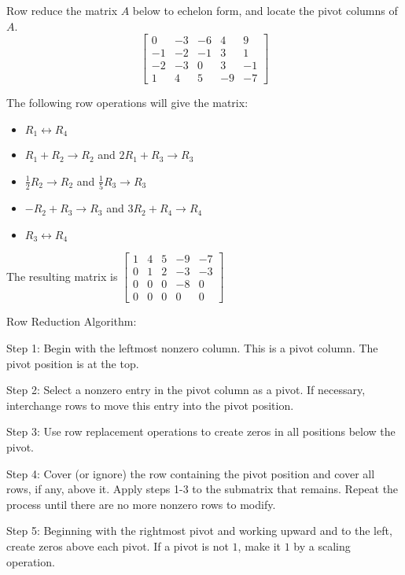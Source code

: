 \documentclass[../linalg.tex]{subfiles}
\begin{document}
\begin{example}
    Row reduce the matrix $A$ below to echelon form, and locate the pivot columns of $A$.
    \[ \begin{bmatrix}
        0 & -3 & -6 & 4 & 9\\
        -1 & -2 & -1 & 3 & 1\\
        -2 & -3 & 0 & 3 &-1\\
        1&4&5&-9&-7
    \end{bmatrix} \]

    The following row operations will give the matrix:
    \begin{itemize}
        \item $R_1 \leftrightarrow R_4$
        \item $R_1 + R_2 \rightarrow R_2$ and $2R_1+R_3\rightarrow R_3$
        \item $\frac{1}{2}R_2\rightarrow R_2$ and $\frac{1}{5}R_3 \rightarrow R_3$
        \item $-R_2+R_3\rightarrow R_3$ and $3R_2+R_4\rightarrow R_4$
        \item $R_3\leftrightarrow R_4$
    \end{itemize}

    The resulting matrix is $\begin{bmatrix}
        1 & 4 & 5 & -9 & -7\\
        0 & 1 & 2 & -3 & -3\\
        0 & 0 & 0 & -8 & 0\\
        0 & 0 & 0 & 0 & 0
    \end{bmatrix}$
\end{example}

Row Reduction Algorithm:

Step 1: Begin with the leftmost nonzero column. This is a pivot column. The pivot position is at the top.

Step 2: Select a nonzero entry in the pivot column as a pivot. If necessary, interchange rows to move this entry into the pivot position.

Step 3: Use row replacement operations to create zeros in all positions below the pivot.

Step 4: Cover (or ignore) the row containing the pivot position and cover all rows, if any, above it. Apply steps 1-3 to the submatrix that remains. Repeat the process until there are no more nonzero rows to modify. 

Step 5: Beginning with the rightmost pivot and working upward and to the left, create zeros above each pivot. If a pivot is not $1$, make it $1$ by a scaling operation.
\end{document}
